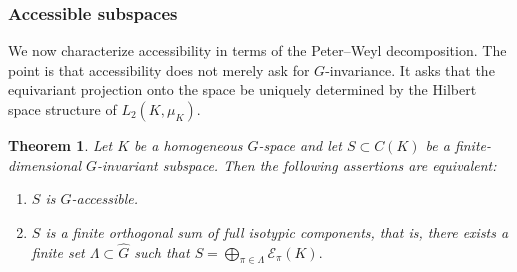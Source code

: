 \documentclass[11pt,showkeys]{amsart}
\newtheorem{theorem}{Theorem}[section]
\begin{document}
\subsubsection{Accessible subspaces}

We now characterize accessibility in terms of the Peter--Weyl
decomposition. The point is that accessibility does not merely ask for
\(G\)-invariance. It asks that the equivariant projection onto the space
be uniquely determined by the Hilbert space structure of \(L_2(K,\mu_K)\).

\begin{theorem}
\label{thm:accessible-subspaces}
Let \(K\) be a homogeneous \(G\)-space and let
\(S\subset C(K)\) be a finite-dimensional \(G\)-invariant subspace. Then
the following assertions are equivalent:
\begin{enumerate}
\item \(S\) is \(G\)-accessible.
\item \(S\) is a finite orthogonal sum of full isotypic components, that
      is, there exists a finite set \(\Lambda\subset\widehat G\) such
      that
      \(
              S
              =
              \bigoplus_{\pi\in\Lambda}
              \mathcal E_\pi(K).
      \)
\end{enumerate}
\end{theorem}
\end{document}
